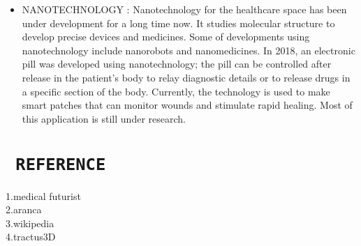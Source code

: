 \documentclass[12pt]{article}
\begin{document}
\begin{itemize}
\item  NANOTECHNOLOGY : Nanotechnology for the healthcare space has been under development for a long time now. It studies molecular structure to develop precise devices and medicines. Some of developments using nanotechnology include nanorobots and nanomedicines. In 2018, an electronic pill was developed using nanotechnology; the pill can be controlled after release in the patient’s body to relay diagnostic details or to release drugs in a specific section of the body. Currently, the technology is used to make smart patches that can monitor wounds and stimulate rapid healing. Most of this application is still under research.

\end{itemize}

\section{\LARGE\texttt{ REFERENCE }}
\large\flushleft 1.medical futurist\\
2.aranca\\
3.wikipedia\\
4.tractus3D
\end{document}
